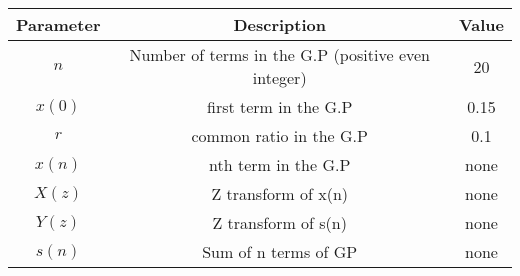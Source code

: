 \renewcommand{\arraystretch}{1.5}
\begin{tabular}{|c|c|c|}
\hline
Parameter & Description & Value \\\hline
\( n \) & Number of terms in the G.P (positive even integer)&20 \\\hline
\(x(0) \) & first term in the G.P&0.15 \\\hline
\( r \) & common ratio in the G.P& 0.1 \\\hline
\( x(n) \) & nth term in the G.P& none \\\hline
\( X(z) \) & Z transform of x(n)& none \\\hline
\( Y(z) \) & Z transform of s(n)& none \\\hline
\(s(n)\)& Sum of n terms of GP& none\\\hline
\end{tabular}
